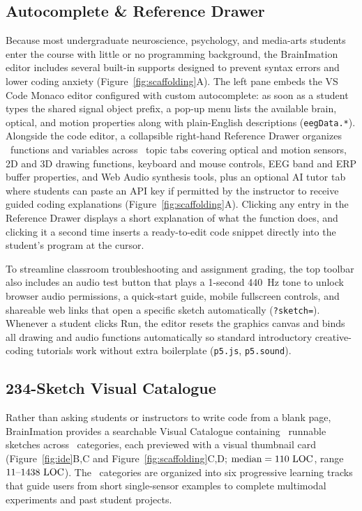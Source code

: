 \documentclass[11pt]{article}
\begin{document}
\subsection{Autocomplete \& Reference Drawer}
Because most undergraduate neuroscience, psychology, and media-arts students enter the course with little or no programming background, the BrainImation editor includes several built-in supports designed to prevent syntax errors and lower coding anxiety \citep{iemi2026icancode} (Figure~\ref{fig:scaffolding}A). The left pane embeds the VS Code Monaco editor configured with custom autocomplete: as soon as a student types the shared signal object prefix, a pop-up menu lists the available brain, optical, and motion properties along with plain-English descriptions (\texttt{eegData.*}). Alongside the code editor, a collapsible right-hand Reference Drawer organizes \NRefAPIs\ functions and variables across \NRefTabs\ topic tabs covering optical and motion sensors, 2D and 3D drawing functions, keyboard and mouse controls, EEG band and ERP buffer properties, and Web Audio synthesis tools, plus an optional AI tutor tab where students can paste an API key if permitted by the instructor to receive guided coding explanations \citep{clindeffarges2026socrates} (Figure~\ref{fig:scaffolding}A). Clicking any entry in the Reference Drawer displays a short explanation of what the function does, and clicking it a second time inserts a ready-to-edit code snippet directly into the student's program at the cursor.

To streamline classroom troubleshooting and assignment grading, the top toolbar also includes an audio test button that plays a 1-second 440~Hz tone to unlock browser audio permissions, a quick-start guide, mobile fullscreen controls, and shareable web links that open a specific sketch automatically (\texttt{?sketch=}). Whenever a student clicks Run, the editor resets the graphics canvas and binds all drawing and audio functions automatically so standard introductory creative-coding tutorials work without extra boilerplate (\texttt{p5.js}, \texttt{p5.sound}).

\subsection{234-Sketch Visual Catalogue}
Rather than asking students or instructors to write code from a blank page, BrainImation provides a searchable Visual Catalogue containing \NCatalogueSketches\ runnable sketches across \NCatalogueCategories\ categories, each previewed with a visual thumbnail card (Figure~\ref{fig:ide}B,C and Figure~\ref{fig:scaffolding}C,D; $\text{median} = 110\text{ LOC}$, range $11\text{--}1438\text{ LOC}$). The \NCatalogueCategories\ categories are organized into six progressive learning tracks that guide users from short single-sensor examples to complete multimodal experiments and past student projects.
\end{document}
